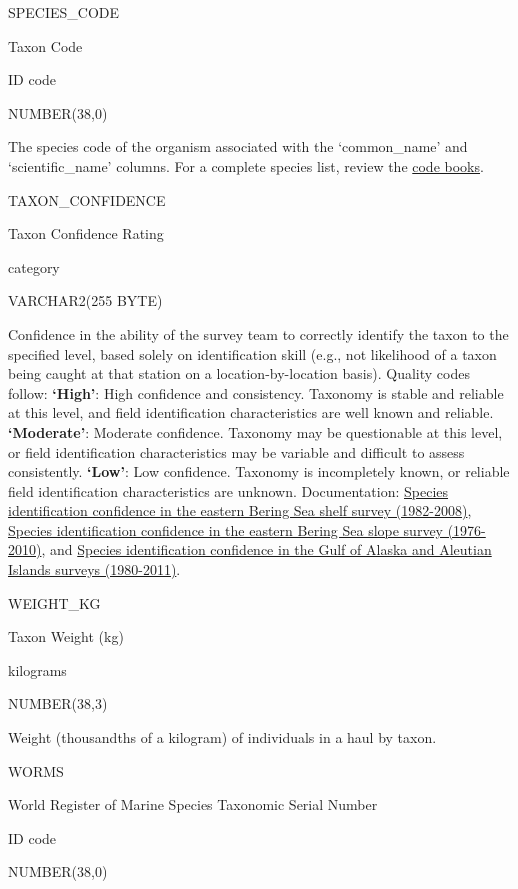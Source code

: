 \documentclass[
  letterpaper,
  oneside,
  open=any]{scrbook}
\begin{document}
SPECIES\_CODE

Taxon Code

ID code

NUMBER(38,0)

The species code of the organism associated with the `common\_name' and
`scientific\_name' columns. For a complete species list, review the
\href{https://www.fisheries.noaa.gov/resource/document/groundfish-survey-species-code-manual-and-data-codes-manual}{code
books}.

TAXON\_CONFIDENCE

Taxon Confidence Rating

category

VARCHAR2(255 BYTE)

Confidence in the ability of the survey team to correctly identify the
taxon to the specified level, based solely on identification skill
(e.g., not likelihood of a taxon being caught at that station on a
location-by-location basis). Quality codes follow: \textbf{`High'}: High
confidence and consistency. Taxonomy is stable and reliable at this
level, and field identification characteristics are well known and
reliable. \textbf{`Moderate'}: Moderate confidence. Taxonomy may be
questionable at this level, or field identification characteristics may
be variable and difficult to assess consistently. \textbf{`Low'}: Low
confidence. Taxonomy is incompletely known, or reliable field
identification characteristics are unknown. Documentation:
\href{http://apps-afsc.fisheries.noaa.gov/Publications/ProcRpt/PR2009-04.pdf}{Species
identification confidence in the eastern Bering Sea shelf survey
(1982-2008)},
\href{http://apps-afsc.fisheries.noaa.gov/Publications/ProcRpt/PR2014-05.pdf}{Species
identification confidence in the eastern Bering Sea slope survey
(1976-2010)}, and
\href{http://apps-afsc.fisheries.noaa.gov/Publications/ProcRpt/PR2014-01.pdf}{Species
identification confidence in the Gulf of Alaska and Aleutian Islands
surveys (1980-2011)}.

WEIGHT\_KG

Taxon Weight (kg)

kilograms

NUMBER(38,3)

Weight (thousandths of a kilogram) of individuals in a haul by taxon.

WORMS

World Register of Marine Species Taxonomic Serial Number

ID code

NUMBER(38,0)
\end{document}
